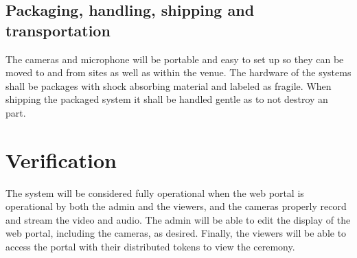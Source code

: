 \documentclass[onecolumn, draftclsnofoot,10pt, compsoc]{IEEEtran}
\begin{document}
    \subsection{Packaging, handling, shipping and transportation}
    The cameras and microphone will be portable and easy to set up so they can be moved to and from sites as well as within the venue. 
    The hardware of the systems shall be packages with shock absorbing material and labeled as fragile. 
    When shipping the packaged system it shall be handled gentle as to not destroy an part. 
    
\section{Verification}
The system will be considered fully operational when the web portal is operational by both the admin and the viewers, and the cameras properly record and stream the video and audio.
The admin will be able to edit the display of the web portal, including the cameras, as desired.
Finally, the viewers will be able to access the portal with their distributed tokens to view the ceremony. 
\end{document}
